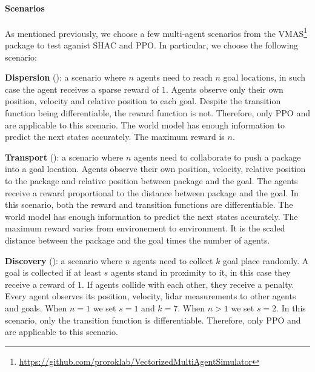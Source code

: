 \paragraph{Scenarios}
As mentioned previously, we choose a few multi-agent scenarios from the VMAS\footnote{\url{https://github.com/proroklab/VectorizedMultiAgentSimulator}} package to test \fname{} aganist SHAC and PPO. In particular, we choose the following scenario:
\begin{compactitem}
    \item \textbf{Dispersion} (): 
         a scenario where $n$ agents need to reach $n$ goal locations, in such case the agent receives a sparse reward of $1$. Agents observe only their own position, velocity and relative position to each goal. 
         Despite the transition function being differentiable, the reward function is not. Therefore, only PPO and \fname{} are applicable to this scenario. 
         The world model has enough information to predict the next states accurately.
         The maximum reward is $n$.
    \item \textbf{Transport} (): 
         a scenario where $n$ agents need to collaborate to push a package into a goal location. Agents observe their own position, velocity, relative position to the package and relative position between package and the goal. The agents receive a reward proportional to the distance between package and the goal. 
         In this scenario, both the reward and transition functions are differentiable. 
         The world model has enough information to predict the next states accurately.
         The maximum reward varies from environement to environment. It is the scaled distance between the package and the goal times the number of agents.
    \item \textbf{Discovery} (): 
         a scenario where $n$ agents need to collect $k$ goal place randomly. A goal is collected if at least $s$ agents stand in proximity to it, in this case they receive a reward of $1$. If agents collide with each other, they receive a penalty. Every agent observes its position, velocity, lidar measurements to other agents and goals. When $n=1$ we set $s=1$ and $k=7$. When $n>1$ we set $s=2$.
         In this scenario, only the transition function is differentiable. Therefore, only PPO and \fname{} are applicable to this scenario. 

\end{compactitem}
